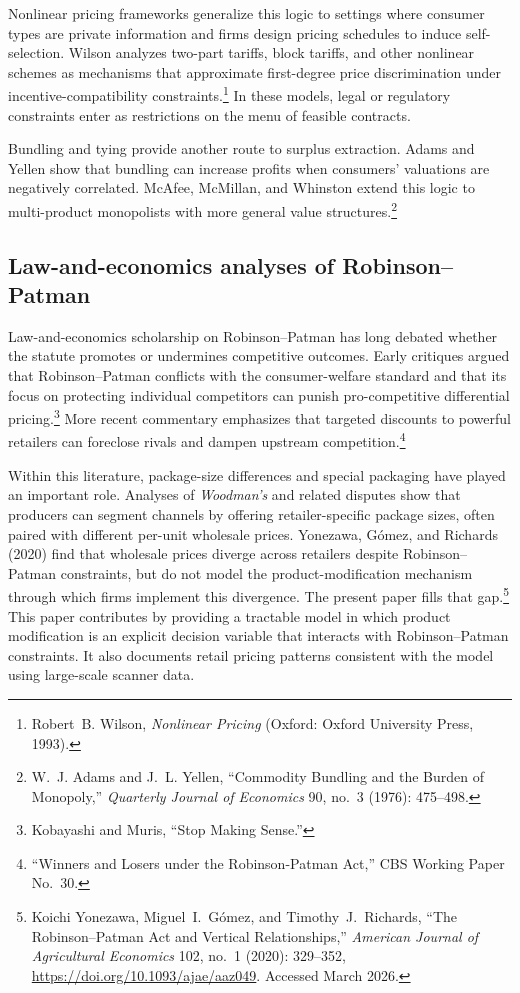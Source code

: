 \documentclass[12pt]{article}
\theoremstyle{definition}
\begin{document}
Nonlinear pricing frameworks generalize this logic to settings where consumer types are private information and firms design pricing schedules to induce self-selection.
Wilson analyzes two-part tariffs, block tariffs, and other nonlinear schemes as mechanisms that approximate first-degree price discrimination under incentive-compatibility constraints.\footnote{Robert~B. Wilson, \textit{Nonlinear Pricing} (Oxford: Oxford University Press, 1993).}
In these models, legal or regulatory constraints enter as restrictions on the menu of feasible contracts.

Bundling and tying provide another route to surplus extraction.
Adams and Yellen show that bundling can increase profits when consumers' valuations are negatively correlated. McAfee, McMillan, and Whinston extend this logic to multi-product monopolists with more general value structures.\footnote{W.~J. Adams and J.~L. Yellen, ``Commodity Bundling and the Burden of Monopoly,'' \textit{Quarterly Journal of Economics} 90, no.~3 (1976): 475--498.}

\subsection{Law-and-economics analyses of Robinson--Patman}

Law-and-economics scholarship on Robinson--Patman has long debated whether the statute promotes or undermines competitive outcomes.
Early critiques argued that Robinson--Patman conflicts with the consumer-welfare standard and that its focus on protecting individual competitors can punish pro-competitive differential pricing.\footnote{Kobayashi and Muris, ``Stop Making Sense.''}
More recent commentary emphasizes that targeted discounts to powerful retailers can foreclose rivals and dampen upstream competition.\footnote{``Winners and Losers under the Robinson-Patman Act,'' CBS Working Paper No.\ 30.}

Within this literature, package-size differences and special packaging have played an important role.
Analyses of \textit{Woodman's} and related disputes show that producers can segment channels by offering retailer-specific package sizes, often paired with different per-unit wholesale prices.
Yonezawa, G\'{o}mez, and Richards (2020) find that wholesale prices diverge across retailers despite Robinson--Patman constraints, but do not model the product-modification mechanism through which firms implement this divergence. The present paper fills that gap.\footnote{Koichi Yonezawa, Miguel~I.\ G\'{o}mez, and Timothy~J.\ Richards, ``The Robinson--Patman Act and Vertical Relationships,'' \textit{American Journal of Agricultural Economics} 102, no.~1 (2020): 329--352, \url{https://doi.org/10.1093/ajae/aaz049}. Accessed March 2026.}
This paper contributes by providing a tractable model in which product modification is an explicit decision variable that interacts with Robinson--Patman constraints. It also documents retail pricing patterns consistent with the model using large-scale scanner data.
\end{document}
